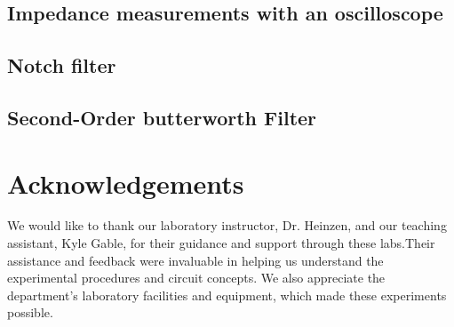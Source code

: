 \documentclass{article}
\begin{document}
\subsection{Impedance measurements with an oscilloscope}


\subsection{Notch filter}

\subsection{Second-Order butterworth Filter}


\section*{Acknowledgements}

We would like to thank our laboratory instructor, Dr. Heinzen, and our teaching 
assistant, Kyle Gable, for their guidance and support through these labs.Their 
assistance and feedback were invaluable in helping us understand the experimental 
procedures and circuit concepts. We also appreciate the department's laboratory 
facilities and equipment, which made these experiments possible.
\end{document}
